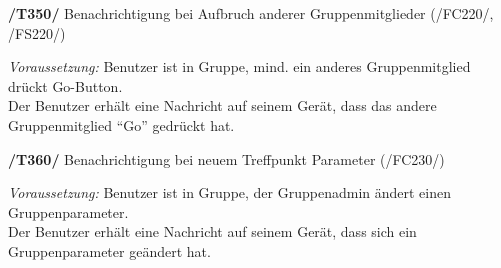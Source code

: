 \textbf{/T350/} Benachrichtigung bei Aufbruch anderer Gruppenmitglieder (/FC220/, /FS220/)\\
\begin{center}
\vspace{-\parskip}
\begin{minipage}[t]{0.9\textwidth}
\emph{Voraussetzung:} Benutzer ist in Gruppe, mind. ein anderes Gruppenmitglied drückt Go-Button.\\
Der Benutzer erhält eine Nachricht auf seinem Gerät, dass das andere Gruppenmitglied "`Go"' gedrückt hat.\\
\end{minipage}
\end{center}

\textbf{/T360/} Benachrichtigung bei neuem Treffpunkt Parameter (/FC230/)\\
\begin{center}
\vspace{-\parskip}
\begin{minipage}[t]{0.9\textwidth}
\emph{Voraussetzung:} Benutzer ist in Gruppe, der Gruppenadmin ändert einen Gruppenparameter.\\
Der Benutzer erhält eine Nachricht auf seinem Gerät, dass sich ein Gruppenparameter geändert hat.\\
\end{minipage}
\end{center}

